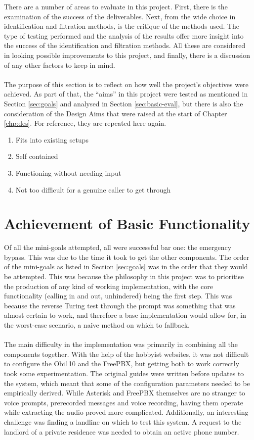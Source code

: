 \documentclass[main.tex]{subfiles}
\begin{document}
There are a number of areas to evaluate in this project. First, there is the examination of the success of the deliverables. Next, from the wide choice in identification and filtration methods, is the critique of the methods used. The type of testing performed and the analysis of the results offer more insight into the success of the identification and filtration methods. All these are considered in looking possible improvements to this project, and finally, there is a discussion of any other factors to keep in mind.
\\\\
The purpose of this section is to reflect on how well the project's objectives were achieved. As part of that, the ``aims'' in this project were tested as mentioned in Section \ref{sec:goals} and analysed in Section \ref{sec:basic-eval}, but there is also the consideration of the Design Aims that were raised at the start of Chapter \ref{chp:des}. For reference, they are repeated here again.

\begin{enumerate}
	\item Fits into existing setups
	\item Self contained
	\item Functioning without needing input
	\item Not too difficult for a genuine caller to get through
\end{enumerate}

\section{Achievement of Basic Functionality}
Of all the mini-goals attempted, all were successful bar one: the emergency bypass. This was due to the time it took to get the other components. The order of the mini-goals as listed in Section \ref{sec:goals} was in the order that they would be attempted. This was because the philosophy in this project was to prioritise the production of any kind of working implementation, with the core functionality (calling in and out, unhindered) being the first step. This was because the reverse Turing test through the prompt was something that was almost certain to work, and therefore a base implementation would allow for, in the worst-case scenario, a naive method on which to fallback.
\\\\
The main difficulty in the implementation was primarily in combining all the components together. With the help of the hobbyist websites, it was not difficult to configure the Obi110 and the FreePBX, but getting both to work correctly took some experimentation. The original guides were written before updates to the system, which meant that some of the configuration parameters needed to be empirically derived. While Asterisk and FreePBX themselves are no stranger to voice prompts, prerecorded messages and voice recording, having them operate while extracting the audio proved more complicated. Additionally, an interesting challenge was finding a landline on which to test this system. A request to the landlord of a private residence was needed to obtain an active phone number.
\end{document}
